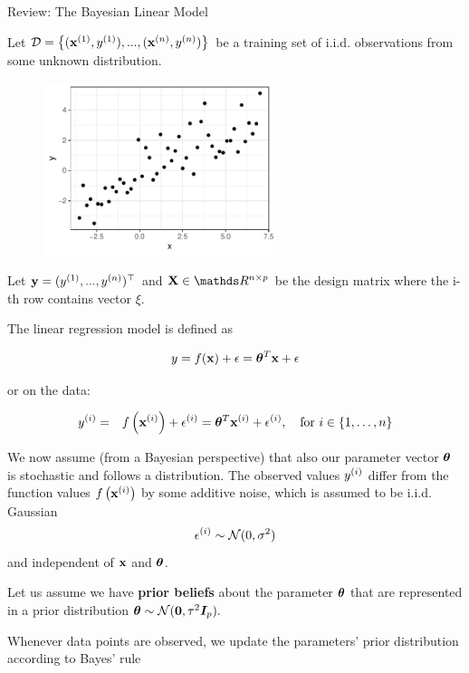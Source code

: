 \documentclass[11pt,compress,t,notes=noshow, xcolor=table]{beamer}
\begin{document}
\begin{vbframe}{Review: The Bayesian Linear Model}

Let $\D = \left\{(\xi[1], \yi[1]), ..., (\xi[n], \yi[n])\right\}$ be a training set of i.i.d. observations from some unknown distribution.

\begin{figure}
  \includegraphics[width=0.6\textwidth]{figure/bayes_lm/example.pdf}
\end{figure}

Let $\yv = (\yi[1], ..., \yi[n])^\top$ and $\Xmat \in \R^{n \times p}$ be the design matrix where the i-th row contains vector $\xi$.  

\framebreak

The linear regression model is defined as

$$
y = \fx + \epsilon = \thetav^T \xv + \epsilon 
$$

or on the data:

\begin{eqnarray*}
\yi &=& \fxi + \epsi = \thetav^T \xi + \epsi, \quad \text{for } i \in \{1, \ldots, n\}
\end{eqnarray*}


We now assume (from a Bayesian perspective) that also our parameter vector $\thetav$ is stochastic and follows a distribution.
The observed values $\yi$ differ from the function values $\fxi$ by some additive noise, which is assumed to be i.i.d. Gaussian 
$$
\epsi \sim \mathcal{N}(0, \sigma^2)$$
and independent of $\xv$ and $\thetav$.

\framebreak

Let us assume we have \textbf{prior beliefs} about the parameter $\thetav$ that are represented in a prior distribution $\thetav \sim \mathcal{N}(\zero, \tau^2 \id_p).$

\lz 

Whenever data points are observed, we update the parameters' prior distribution according to Bayes' rule 


\end{vbframe}
\end{document}
